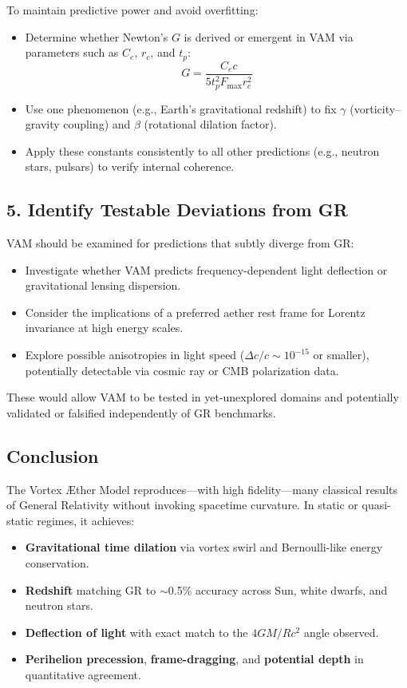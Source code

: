 To maintain predictive power and avoid overfitting:

\begin{itemize}
    \item Determine whether Newton’s $G$ is derived or emergent in VAM via parameters such as $C_e$, $r_c$, and $t_p$:
    \begin{equation}
        G = \frac{C_e c}{5 t_p^2 F_{\max} r_c^2}
    \end{equation}
    \item Use one phenomenon (e.g., Earth’s gravitational redshift) to fix $\gamma$ (vorticity–gravity coupling) and $\beta$ (rotational dilation factor).
    \item Apply these constants consistently to all other predictions (e.g., neutron stars, pulsars) to verify internal coherence.
\end{itemize}

\subsection*{5. Identify Testable Deviations from GR}

VAM should be examined for predictions that subtly diverge from GR:

\begin{itemize}
    \item Investigate whether VAM predicts frequency-dependent light deflection or gravitational lensing dispersion.
    \item Consider the implications of a preferred aether rest frame for Lorentz invariance at high energy scales.
    \item Explore possible anisotropies in light speed ($\Delta c/c \sim 10^{-15}$ or smaller), potentially detectable via cosmic ray or CMB polarization data.
\end{itemize}

These would allow VAM to be tested in yet-unexplored domains and potentially validated or falsified independently of GR benchmarks.

\subsection*{Conclusion}

The Vortex Æther Model reproduces—with high fidelity—many classical results of General Relativity without invoking spacetime curvature. In static or quasi-static regimes, it achieves:

\begin{itemize}
    \item \textbf{Gravitational time dilation} via vortex swirl and Bernoulli-like energy conservation.
    \item \textbf{Redshift} matching GR to $\sim$0.5\% accuracy across Sun, white dwarfs, and neutron stars.
    \item \textbf{Deflection of light} with exact match to the $4GM/Rc^2$ angle observed.
    \item \textbf{Perihelion precession}, \textbf{frame-dragging}, and \textbf{potential depth} in quantitative agreement.
\end{itemize}

